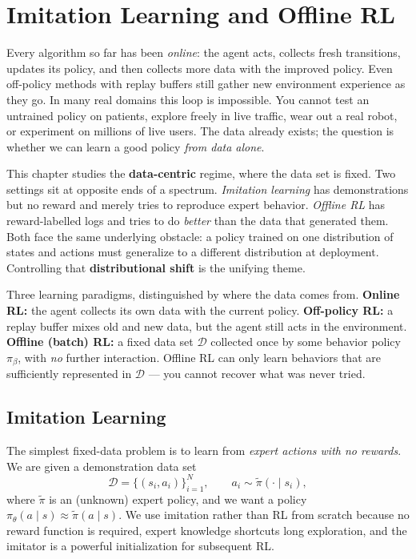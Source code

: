 \documentclass[11pt, oneside]{book}
\newcommand{\dataset}{\mathcal{D}}       %
\begin{document}
\chapter{Imitation Learning and Offline RL}

Every algorithm so far has been \emph{online}: the agent acts, collects fresh
transitions, updates its policy, and then collects more data with the improved policy.
Even off-policy methods with replay buffers still gather new environment experience
as they go. In many real domains this loop is impossible. You cannot test an untrained
policy on patients, explore freely in live traffic, wear out a real robot, or experiment
on millions of live users. The data already exists; the question is whether we can learn
a good policy \emph{from data alone}.

This chapter studies the \textbf{data-centric} regime, where the data set is fixed.
Two settings sit at opposite ends of a spectrum. \emph{Imitation learning} has
demonstrations but no reward and merely tries to reproduce expert behavior.
\emph{Offline RL} has reward-labelled logs and tries to do \emph{better} than the data
that generated them. Both face the same underlying obstacle: a policy trained on one
distribution of states and actions must generalize to a different distribution at
deployment. Controlling that \textbf{distributional shift} is the unifying theme.

\begin{intbox}
Three learning paradigms, distinguished by where the data comes from.
\textbf{Online RL:} the agent collects its own data with the current policy.
\textbf{Off-policy RL:} a replay buffer mixes old and new data, but the agent still
acts in the environment. \textbf{Offline (batch) RL:} a fixed data set $\dataset$
collected once by some behavior policy $\pi_\beta$, with \emph{no} further interaction.
Offline RL can only learn behaviors that are sufficiently represented in $\dataset$ ---
you cannot recover what was never tried.
\end{intbox}

\section{Imitation Learning}

The simplest fixed-data problem is to learn from \emph{expert actions with no rewards}.
We are given a demonstration data set
\[
  \dataset = \{(s_i, a_i)\}_{i=1}^N, \qquad a_i \sim \tilde\pi(\cdot \mid s_i),
\]
where $\tilde\pi$ is an (unknown) expert policy, and we want a policy
$\pi_\theta(a \mid s) \approx \tilde\pi(a \mid s)$. We use imitation rather than RL
from scratch because no reward function is required, expert knowledge shortcuts long
exploration, and the imitator is a powerful initialization for subsequent RL.
\end{document}
